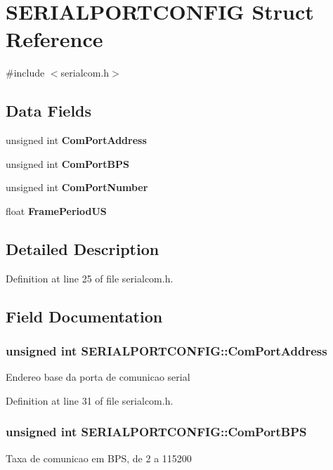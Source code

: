 \section{SERIALPORTCONFIG Struct Reference}
\label{structSERIALPORTCONFIG}


{\ttfamily \#include $<$serialcom.h$>$}\subsection*{Data Fields}
\begin{DoxyCompactItemize}
\item 
unsigned int {\bf ComPortAddress}
\item 
unsigned int {\bf ComPortBPS}
\item 
unsigned int {\bf ComPortNumber}
\item 
float {\bf FramePeriodUS}
\end{DoxyCompactItemize}


\subsection{Detailed Description}


Definition at line 25 of file serialcom.h.

\subsection{Field Documentation}
\subsubsection[{ComPortAddress}]{\setlength{\rightskip}{0pt plus 5cm}unsigned int {\bf SERIALPORTCONFIG::ComPortAddress}}\label{structSERIALPORTCONFIG_a60c95986733fae1a71ab89bd97ebfed4}
Endereo base da porta de comunicao serial 

Definition at line 31 of file serialcom.h.
\subsubsection[{ComPortBPS}]{\setlength{\rightskip}{0pt plus 5cm}unsigned int {\bf SERIALPORTCONFIG::ComPortBPS}}\label{structSERIALPORTCONFIG_aa6dea3f4c4292d4be56bbf2d7ac4c196}
Taxa de comunicao em BPS, de 2 a 115200 

